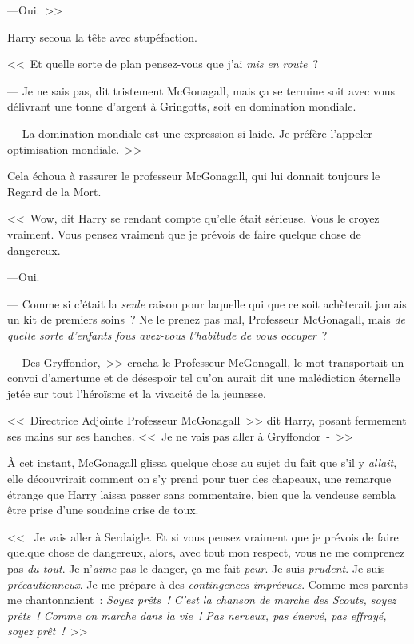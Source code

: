 ---Oui.~>>

Harry secoua la tête avec stupéfaction.

<<~Et quelle sorte de plan pensez-vous que j'ai \emph{mis} \emph{en route}~?

--- Je ne sais pas, dit tristement McGonagall, mais ça se termine soit avec vous délivrant une tonne d'argent à Gringotts, soit en domination mondiale.

--- La domination mondiale est une expression si laide. Je préfère l'appeler optimisation mondiale.~>>

Cela échoua à rassurer le professeur McGonagall, qui lui donnait toujours le Regard de la Mort.

<<~Wow, dit Harry se rendant compte qu'elle était sérieuse. Vous le croyez vraiment. Vous pensez vraiment que je prévois de faire quelque chose de dangereux.

---Oui.

--- Comme si c'était la \emph{seule} raison pour laquelle qui que ce soit achèterait jamais un kit de premiers soins~? Ne le prenez pas mal, Professeur McGonagall, mais \emph{de quelle sorte d'enfants fous avez-vous l'habitude de vous occuper}~?

--- Des Gryffondor,~>> cracha le Professeur McGonagall, le mot transportait un convoi d'amertume et de désespoir tel qu'on aurait dit une malédiction éternelle jetée sur tout l'héroïsme et la vivacité de la jeunesse.

<<~Directrice Adjointe Professeur McGonagall~>> dit Harry, posant fermement ses mains sur ses hanches. <<~Je ne vais pas aller à Gryffondor~-~>>

À cet instant, McGonagall glissa quelque chose au sujet du fait que s'il y \emph{allait}, elle découvrirait comment on s'y prend pour tuer des chapeaux, une remarque étrange que Harry laissa passer sans commentaire, bien que la vendeuse sembla être prise d'une soudaine crise de toux.

<<~ Je vais aller à Serdaigle. Et si vous pensez vraiment que je prévois de faire quelque chose de dangereux, alors, avec tout mon respect, vous ne me comprenez pas \emph{du tout}. Je n'\emph{aime} pas le danger, ça me fait \emph{peur}. Je suis \emph{prudent}. Je suis \emph{précautionneux}. Je me prépare à des \emph{contingences imprévues}. Comme mes parents me chantonnaient~: \emph{Soyez prêts~! C'est la chanson de marche des Scouts, soyez prêts~! Comme on marche dans la vie~! Pas nerveux, pas énervé, pas effrayé, soyez prêt~!}~>>


